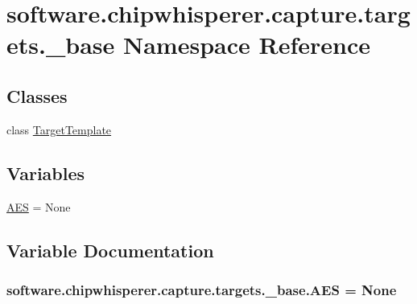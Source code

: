 \hypertarget{namespacesoftware_1_1chipwhisperer_1_1capture_1_1targets_1_1__base}{}\section{software.\+chipwhisperer.\+capture.\+targets.\+\_\+base Namespace Reference}
\label{namespacesoftware_1_1chipwhisperer_1_1capture_1_1targets_1_1__base}
\subsection*{Classes}
\begin{DoxyCompactItemize}
\item 
class \hyperlink{classsoftware_1_1chipwhisperer_1_1capture_1_1targets_1_1__base_1_1TargetTemplate}{Target\+Template}
\end{DoxyCompactItemize}
\subsection*{Variables}
\begin{DoxyCompactItemize}
\item 
\hyperlink{namespacesoftware_1_1chipwhisperer_1_1capture_1_1targets_1_1__base_a45c17a0f9f9096fd583a8ed1fda18272}{A\+E\+S} = None
\end{DoxyCompactItemize}


\subsection{Variable Documentation}
\hypertarget{namespacesoftware_1_1chipwhisperer_1_1capture_1_1targets_1_1__base_a45c17a0f9f9096fd583a8ed1fda18272}{}
\subsubsection[{A\+E\+S}]{\setlength{\rightskip}{0pt plus 5cm}software.\+chipwhisperer.\+capture.\+targets.\+\_\+base.\+A\+E\+S = None}\label{namespacesoftware_1_1chipwhisperer_1_1capture_1_1targets_1_1__base_a45c17a0f9f9096fd583a8ed1fda18272}
